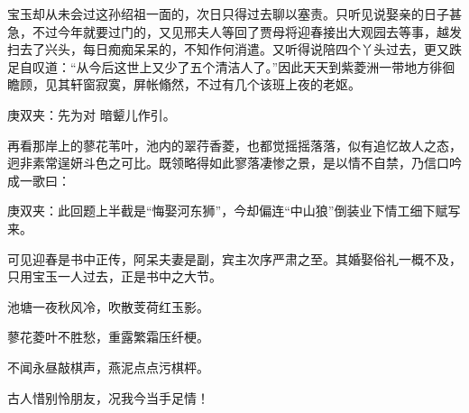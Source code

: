 \begin{parag}
    宝玉却从未会过这孙绍祖一面的，次日只得过去聊以塞责。只听见说娶亲的日子甚急，不过今年就要过门的，又见邢夫人等回了贾母将迎春接出大观园去等事，越发扫去了兴头，每日痴痴呆呆的，不知作何消遣。又听得说陪四个丫头过去，更又跌足自叹道：“从今后这世上又少了五个清洁人了。”因此天天到紫菱洲一带地方徘徊瞻顾，见其轩窗寂寞，屏帐翛然，不过有几个该班上夜的老妪。\begin{note}庚双夹：先为对 暗颦儿作引。\end{note}再看那岸上的蓼花苇叶，池内的翠荇香菱，也都觉摇摇落落，似有追忆故人之态，迥非素常逞妍斗色之可比。既领略得如此寥落凄惨之景，是以情不自禁，乃信口吟成一歌曰：\begin{note}庚双夹：此回题上半截是“悔娶河东狮”，今却偏连“中山狼”倒装业下情工细下赋写来。\end{note}\begin{note}可见迎春是书中正传，阿呆夫妻是副，宾主次序严肃之至。其婚娶俗礼一概不及，只用宝玉一人过去，正是书中之大节。\end{note}
\end{parag}


\begin{poem}
    \begin{pl}池塘一夜秋风冷，吹散芰荷红玉影。\end{pl}

    \begin{pl}蓼花菱叶不胜愁，重露繁霜压纤梗。\end{pl}

    \begin{pl}不闻永昼敲棋声，燕泥点点污棋枰。\end{pl}

    \begin{pl}古人惜别怜朋友，况我今当手足情！\end{pl}

\end{poem}


